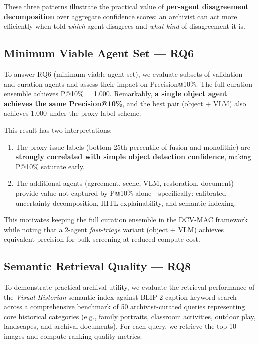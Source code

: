 \documentclass[12pt,onecolumn,a4paper]{IEEEtran}
\begin{document}
These three patterns illustrate the practical value of \textbf{per-agent disagreement decomposition} over aggregate confidence scores: an archivist can act more efficiently when told \textit{which} agent disagrees and \textit{what kind} of disagreement it is.

\subsection{Minimum Viable Agent Set — RQ6}
\label{sec:min_agents}

To answer RQ6 (minimum viable agent set), we evaluate subsets of validation and curation agents and assess their impact on Precision@10\%. The full curation ensemble achieves P@10\% = 1.000. Remarkably, \textbf{a single object agent achieves the same Precision@10\%}, and the best pair (object + VLM) also achieves 1.000 under the proxy label scheme.

This result has two interpretations:
\begin{enumerate}
    \item The proxy issue labels (bottom-25th percentile of fusion and monolithic) are \textbf{strongly correlated with simple object detection confidence}, making P@10\% saturate early.
    \item The additional agents (agreement, scene, VLM, restoration, document) provide value not captured by P@10\% alone---specifically: calibrated uncertainty decomposition, HITL explainability, and semantic indexing.
\end{enumerate}
This motivates keeping the full curation ensemble in the DCV-MAC framework while noting that a 2-agent \textit{fast-triage} variant (object + VLM) achieves equivalent precision for bulk screening at reduced compute cost.

\subsection{Semantic Retrieval Quality — RQ8}
\label{sec:retrieval}

To demonstrate practical archival utility, we evaluate the retrieval performance of the \textit{Visual Historian} semantic index against BLIP-2 caption keyword search across a comprehensive benchmark of 50 archivist-curated queries representing core historical categories (e.g., family portraits, classroom activities, outdoor play, landscapes, and archival documents). For each query, we retrieve the top-10 images and compute ranking quality metrics.
\end{document}

